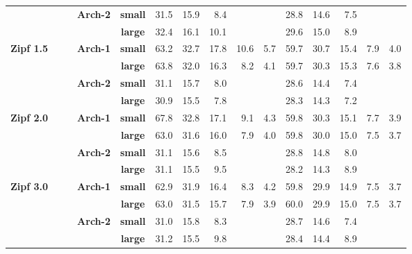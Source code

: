 \documentclass[10pt, conference, compsocconf]{IEEEtran}
\begin{document}
\begin{table}[htbp]
{\begin{tabular}{ccccc||rrrrr|rrrrr}
&&&\multirow{2}{*}{\textbf{Arch-2}} & \textbf{small}  & 31.5    & 15.9   & 8.4   &        &       &  28.8    &  14.6   & 7.5   &        &       \\
&&&& \textbf{large} &  32.4      &   16.1     &       10.1 &        &       &     29.6    &     15.0    &     8.9   &        &   \\ \hline 
\multicolumn{1}{l}{\multirow{4}{*}{\textbf{Zipf 1.5}}}
&&&\multirow{2}{*}{\textbf{Arch-1}} & \textbf{small}  & 63.2    & 32.7   & 17.8   & 10.6   & 5.7   & 59.7    & 30.7    & 15.4   & 7.9   & 4.0   \\
&&&& \textbf{large} & 63.8    & 32.0   & 16.3   &   8.2 & 4.1   &  59.7 &	30.3 &	15.3	& 7.6	& 3.8 \\ \cline{2-15}

&&&\multirow{2}{*}{\textbf{Arch-2}} & \textbf{small}  & 31.1    & 15.7   & 8.0   &        &       &  28.6    &  14.4   & 7.4   &        &       \\
&&&& \textbf{large} &  30.9      &   15.5     &      7.8 &        &       &     28.3    &     14.3    &     7.2   &        &   \\ \hline   
\multicolumn{1}{l}{\multirow{4}{*}{\textbf{Zipf 2.0}}}
&&&\multirow{2}{*}{\textbf{Arch-1}} & \textbf{small}  & 67.8    & 32.8   & 17.1   & 9.1   & 4.3   & 59.8    & 30.3    & 15.1   & 7.7   & 3.9   \\
&&&& \textbf{large} & 63.0    & 31.6   & 16.0   &  7.9 & 4.0   &  59.8 &	30.0&	15.0	& 7.5	& 3.7 \\ \cline{2-15}

&&&\multirow{2}{*}{\textbf{Arch-2}} & \textbf{small}  & 31.1    & 15.6   & 8.5   &        &       &  28.8    &  14.8   & 8.0   &        &       \\
&&&& \textbf{large} &  31.1      &   15.5     &   9.5 &        &       &     28.2    &     14.3    &     8.9   &        &   \\ \hline
\multicolumn{1}{l}{\multirow{4}{*}{\textbf{Zipf 3.0}}}
&&&\multirow{2}{*}{\textbf{Arch-1}} & \textbf{small}  & 62.9    & 31.9   & 16.4   & 8.3   & 4.2   & 59.8    & 29.9    & 14.9   & 7.5   & 3.7   \\
&&&& \textbf{large} & 63.0    & 31.5   & 15.7   &  7.9 & 3.9   &  60.0 &	29.9&	15.0	& 7.5	& 3.7 \\ \cline{2-15}

&&&\multirow{2}{*}{\textbf{Arch-2}} & \textbf{small}  & 31.0    & 15.8   & 8.3   &        &       &  28.7    &  14.6   & 7.4   &        &       \\
&&&& \textbf{large} &  31.2      &   15.5     &   9.8 &        &       &    28.4    &     14.4    &     8.9   &        &   \\ %


\end{tabular}}
\end{table}
\end{document}
